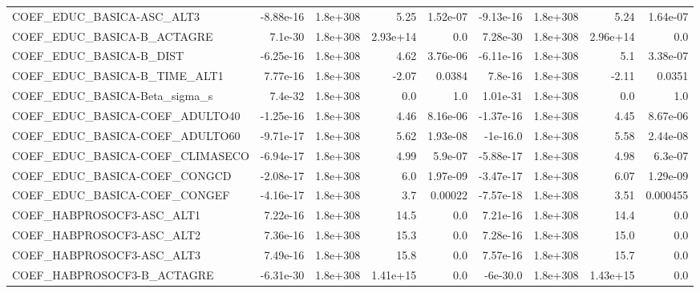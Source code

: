 \begin{tabular}{lrrrrrrrr}
COEF\_EDUC\_BASICA-ASC\_ALT3         &   -8.88e-16 &     1.8e+308 &      5.25 & 1.52e-07 &  -9.13e-16 &    1.8e+308 &         5.24 &      1.64e-07 \\
COEF\_EDUC\_BASICA-B\_ACTAGRE        &     7.1e-30 &     1.8e+308 &  2.93e+14 &      0.0 &   7.28e-30 &    1.8e+308 &     2.96e+14 &           0.0 \\
COEF\_EDUC\_BASICA-B\_DIST           &   -6.25e-16 &     1.8e+308 &      4.62 & 3.76e-06 &  -6.11e-16 &    1.8e+308 &          5.1 &      3.38e-07 \\
COEF\_EDUC\_BASICA-B\_TIME\_ALT1      &    7.77e-16 &     1.8e+308 &     -2.07 &   0.0384 &    7.8e-16 &    1.8e+308 &        -2.11 &        0.0351 \\
COEF\_EDUC\_BASICA-Beta\_sigma\_s     &     7.4e-32 &     1.8e+308 &       0.0 &      1.0 &   1.01e-31 &    1.8e+308 &          0.0 &           1.0 \\
COEF\_EDUC\_BASICA-COEF\_ADULTO40    &   -1.25e-16 &     1.8e+308 &      4.46 & 8.16e-06 &  -1.37e-16 &    1.8e+308 &         4.45 &      8.67e-06 \\
COEF\_EDUC\_BASICA-COEF\_ADULTO60    &   -9.71e-17 &     1.8e+308 &      5.62 & 1.93e-08 &   -1e-16.0 &    1.8e+308 &         5.58 &      2.44e-08 \\
COEF\_EDUC\_BASICA-COEF\_CLIMASECO   &   -6.94e-17 &     1.8e+308 &      4.99 &  5.9e-07 &  -5.88e-17 &    1.8e+308 &         4.98 &       6.3e-07 \\
COEF\_EDUC\_BASICA-COEF\_CONGCD      &   -2.08e-17 &     1.8e+308 &       6.0 & 1.97e-09 &  -3.47e-17 &    1.8e+308 &         6.07 &      1.29e-09 \\
COEF\_EDUC\_BASICA-COEF\_CONGEF      &   -4.16e-17 &     1.8e+308 &       3.7 &  0.00022 &  -7.57e-18 &    1.8e+308 &         3.51 &      0.000455 \\
COEF\_HABPROSOCF3-ASC\_ALT1         &    7.22e-16 &     1.8e+308 &      14.5 &      0.0 &   7.21e-16 &    1.8e+308 &         14.4 &           0.0 \\
COEF\_HABPROSOCF3-ASC\_ALT2         &    7.36e-16 &     1.8e+308 &      15.3 &      0.0 &   7.28e-16 &    1.8e+308 &         15.0 &           0.0 \\
COEF\_HABPROSOCF3-ASC\_ALT3         &    7.49e-16 &     1.8e+308 &      15.8 &      0.0 &   7.57e-16 &    1.8e+308 &         15.7 &           0.0 \\
COEF\_HABPROSOCF3-B\_ACTAGRE        &   -6.31e-30 &     1.8e+308 &  1.41e+15 &      0.0 &   -6e-30.0 &    1.8e+308 &     1.43e+15 &           0.0 \\

\end{tabular}
